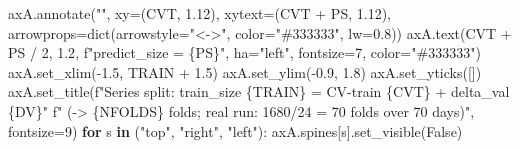 \documentclass[
  english,
  letterpaper,
]{scrbook}
\newenvironment{Shaded}{\begin{snugshade}}{\end{snugshade}}
\newcommand{\BuiltInTok}[1]{\textcolor[rgb]{0.00,0.23,0.31}{#1}}
\newcommand{\ControlFlowTok}[1]{\textcolor[rgb]{0.00,0.23,0.31}{\textbf{#1}}}
\newcommand{\DecValTok}[1]{\textcolor[rgb]{0.68,0.00,0.00}{#1}}
\newcommand{\FloatTok}[1]{\textcolor[rgb]{0.68,0.00,0.00}{#1}}
\newcommand{\KeywordTok}[1]{\textcolor[rgb]{0.00,0.23,0.31}{\textbf{#1}}}
\newcommand{\NormalTok}[1]{\textcolor[rgb]{0.00,0.23,0.31}{#1}}
\newcommand{\OperatorTok}[1]{\textcolor[rgb]{0.37,0.37,0.37}{#1}}
\newcommand{\SpecialCharTok}[1]{\textcolor[rgb]{0.37,0.37,0.37}{#1}}
\newcommand{\SpecialStringTok}[1]{\textcolor[rgb]{0.13,0.47,0.30}{#1}}
\newcommand{\StringTok}[1]{\textcolor[rgb]{0.13,0.47,0.30}{#1}}
\newcommand{\VariableTok}[1]{\textcolor[rgb]{0.07,0.07,0.07}{#1}}
\begin{document}
\begin{Shaded}
\begin{Highlighting}[]
\NormalTok{axA.annotate(}\StringTok{""}\NormalTok{, xy}\OperatorTok{=}\NormalTok{(CVT, }\FloatTok{1.12}\NormalTok{), xytext}\OperatorTok{=}\NormalTok{(CVT }\OperatorTok{+}\NormalTok{ PS, }\FloatTok{1.12}\NormalTok{),}
\NormalTok{             arrowprops}\OperatorTok{=}\BuiltInTok{dict}\NormalTok{(arrowstyle}\OperatorTok{=}\StringTok{"\textless{}{-}\textgreater{}"}\NormalTok{, color}\OperatorTok{=}\StringTok{"\#333333"}\NormalTok{, lw}\OperatorTok{=}\FloatTok{0.8}\NormalTok{))}
\NormalTok{axA.text(CVT }\OperatorTok{+}\NormalTok{ PS }\OperatorTok{/} \DecValTok{2}\NormalTok{, }\FloatTok{1.2}\NormalTok{, }\SpecialStringTok{f"predict\_size = }\SpecialCharTok{\{}\NormalTok{PS}\SpecialCharTok{\}}\SpecialStringTok{"}\NormalTok{, ha}\OperatorTok{=}\StringTok{"left"}\NormalTok{, fontsize}\OperatorTok{=}\DecValTok{7}\NormalTok{,}
\NormalTok{         color}\OperatorTok{=}\StringTok{"\#333333"}\NormalTok{)}
\NormalTok{axA.set\_xlim(}\OperatorTok{{-}}\FloatTok{1.5}\NormalTok{, TRAIN }\OperatorTok{+} \FloatTok{1.5}\NormalTok{)}
\NormalTok{axA.set\_ylim(}\OperatorTok{{-}}\FloatTok{0.9}\NormalTok{, }\FloatTok{1.8}\NormalTok{)}
\NormalTok{axA.set\_yticks([])}
\NormalTok{axA.set\_title(}\SpecialStringTok{f"Series split: train\_size }\SpecialCharTok{\{}\NormalTok{TRAIN}\SpecialCharTok{\}}\SpecialStringTok{ = CV{-}train }\SpecialCharTok{\{}\NormalTok{CVT}\SpecialCharTok{\}}\SpecialStringTok{ + delta\_val }\SpecialCharTok{\{}\NormalTok{DV}\SpecialCharTok{\}}\SpecialStringTok{"}
              \SpecialStringTok{f"   ({-}\textgreater{} }\SpecialCharTok{\{}\NormalTok{NFOLDS}\SpecialCharTok{\}}\SpecialStringTok{ folds; real run: 1680/24 = 70 folds over 70 days)"}\NormalTok{,}
\NormalTok{              fontsize}\OperatorTok{=}\DecValTok{9}\NormalTok{)}
\ControlFlowTok{for}\NormalTok{ s }\KeywordTok{in}\NormalTok{ (}\StringTok{"top"}\NormalTok{, }\StringTok{"right"}\NormalTok{, }\StringTok{"left"}\NormalTok{):}
\NormalTok{    axA.spines[s].set\_visible(}\VariableTok{False}\NormalTok{)}


\end{Highlighting}
\end{Shaded}
\end{document}
